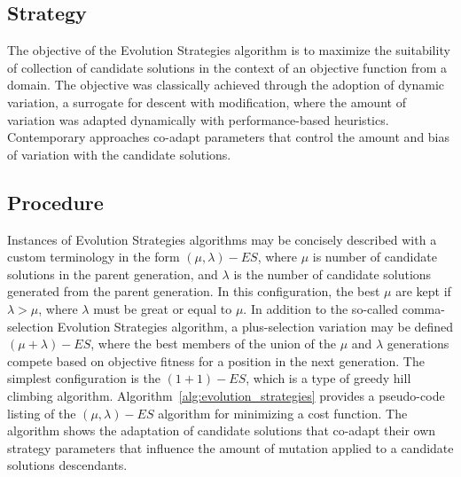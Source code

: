 \subsection{Strategy}
The objective of the Evolution Strategies algorithm is to maximize the suitability of collection of candidate solutions in the context of an objective function from a domain.
The objective was classically achieved through the adoption of dynamic variation, a surrogate for descent with modification, where the amount of variation was adapted dynamically with performance-based heuristics. Contemporary approaches co-adapt parameters that control the amount and bias of variation with the candidate solutions.

\subsection{Procedure}
Instances of Evolution Strategies algorithms may be concisely described with a custom terminology in the form $(\mu,\lambda)-ES$, where $\mu$ is number of candidate solutions in the parent generation, and $\lambda$ is the number of candidate solutions generated from the parent generation. In this configuration, the best $\mu$ are kept if $\lambda > \mu$, where $\lambda$ must be great or equal to $\mu$. In addition to the so-called comma-selection Evolution Strategies algorithm, a plus-selection variation may be defined $(\mu + \lambda)-ES$, where the best members of the union of the $\mu$ and $\lambda$ generations compete based on objective fitness for a position in the next generation. The simplest configuration is the $(1+1)-ES$, which is a type of greedy hill climbing algorithm.
Algorithm~\ref{alg:evolution_strategies} provides a pseudo-code listing of the $(\mu,\lambda)-ES$ algorithm for minimizing a cost function. The algorithm shows the adaptation of candidate solutions that co-adapt their own strategy parameters that influence the amount of mutation applied to a candidate solutions descendants. 


